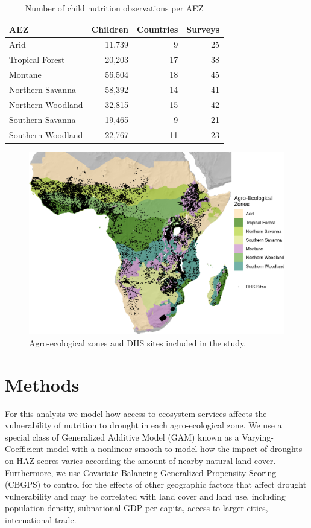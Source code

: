 \documentclass{article}
\begin{document}
\begin{table}[h]
	\begin{center}
	\begin{tabular}{l | r | r | r}
		AEZ & Children & Countries & Surveys \\
		\hline
		Arid & 11,739 & 9 & 25\\
		Tropical Forest & 20,203 & 17 & 38 \\
    Montane & 56,504 & 18 & 45 \\
		Northern Savanna & 58,392 & 14 & 41 \\
		Northern Woodland & 32,815 & 15 & 42 \\
		Southern Savanna & 19,465 & 9 & 21 \\
		Southern Woodland & 22,767 & 11 & 23 \\
	\end{tabular}
\caption{Number of child nutrition observations per AEZ}
\label{table:AEZtab}
\end{center}
\end{table}

\begin{figure}[h]
	\centering
	\includegraphics[width=0.8\linewidth]{AEZ_Sites.png}
	\caption{Agro-ecological zones and DHS sites included in the study.}
	\label{fig:AEZmap}
\end{figure}

\section{Methods}
For this analysis we model how access to ecosystem services affects the vulnerability of nutrition to drought in each agro-ecological zone.  We use a special class of Generalized Additive Model (GAM) known as a Varying-Coefficient model \cite{Wood2017} with a nonlinear smooth to model how the impact of droughts on HAZ scores varies according the amount of nearby natural land cover.  Furthermore, we use Covariate Balancing Generalized Propensity Scoring (CBGPS) \cite{imai2014covariate} to control for the effects of other geographic factors that affect drought vulnerability and may be correlated with land cover and land use, including population density, subnational GDP per capita, access to larger cities, international trade.
\end{document}
